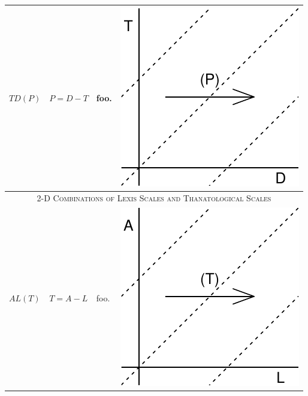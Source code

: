 \documentclass[
  12pt
]{scrartcl}
\begin{document}
\begin{center}
\begin{longtable}{m{}m{}m{}m{}}
  \midrule
  $TD(P)$ & $P = D - T$ &
  foo. &
  \includegraphics[width = \linewidth]{../fig/TDp.pdf} \\
  \midrule
  \multicolumn{4}{c}{\textsc{2-D Combinations of Lexis Scales and Thanatological Scales}} \\
  \midrule
  $AL(T)$ & $T = A - L$ &
  foo. &
  \includegraphics[width = \linewidth]{../fig/ALt.pdf} \\

\end{longtable}
\end{center}
\end{document}
